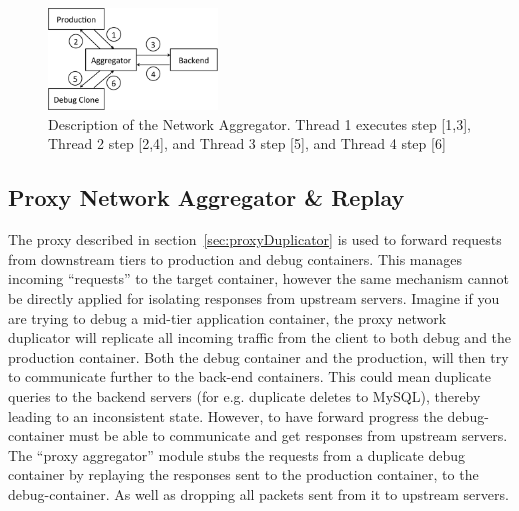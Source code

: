 \begin{figure}[ht]
  \begin{center}
    \includegraphics[width=0.4\textwidth]{figs/aggregator.pdf}
    \caption{Description of the Network Aggregator. Thread 1 executes step [1,3], Thread 2 step [2,4], and Thread 3 step [5], and Thread 4 step [6]}
    \label{fig:aggregator}
  \end{center}
\end{figure}

\subsection{Proxy Network Aggregator \& Replay }
\label{sec:proxyAggregator}
The proxy described in section~\ref{sec:proxyDuplicator} is used to forward requests from downstream tiers to production and debug containers.
This manages incoming ``requests'' to the target container, however the same mechanism cannot be directly applied for isolating responses from upstream servers.
Imagine if you are trying to debug a mid-tier application container, the proxy network duplicator will replicate all incoming traffic from the client to both debug and the production container. 
Both the debug container and the production, will then try to communicate further to the back-end containers.
This could mean duplicate queries to the backend servers (for e.g. duplicate deletes to MySQL), thereby leading to an inconsistent state.
However, to have forward progress the debug-container must be able to communicate and get responses from upstream servers.
The ``proxy aggregator'' module stubs the requests from a duplicate debug container by replaying the responses sent to the production container, to the debug-container.
As well as dropping all packets sent from it to upstream servers.

